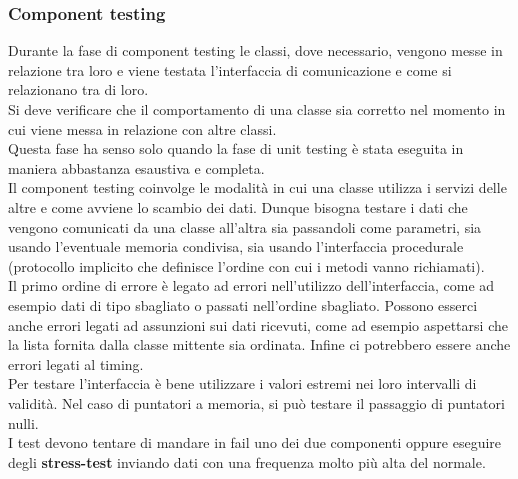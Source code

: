 \subsubsection{Component testing}
Durante la fase di component testing le classi, dove necessario, vengono messe in relazione tra loro e viene testata l'interfaccia di comunicazione e come si relazionano tra di loro.\\
Si deve verificare che il comportamento di una classe sia corretto nel momento in cui viene messa in relazione con altre classi.\\
Questa fase ha senso solo quando la fase di unit testing è stata eseguita in maniera abbastanza esaustiva e completa.\\
Il component testing coinvolge le modalità in cui una classe utilizza i servizi delle altre e come avviene lo scambio dei dati.
Dunque bisogna testare i dati che vengono comunicati da una classe all'altra sia passandoli come parametri, sia usando l'eventuale memoria condivisa, sia usando l'interfaccia procedurale (protocollo implicito che definisce l'ordine con cui i metodi vanno richiamati).\\
Il primo ordine di errore è legato ad errori nell'utilizzo dell'interfaccia, come ad esempio dati di tipo sbagliato o passati nell'ordine sbagliato.
Possono esserci anche errori legati ad assunzioni sui dati ricevuti, come ad esempio aspettarsi che la lista fornita dalla classe mittente sia ordinata.
Infine ci potrebbero essere anche errori legati al timing.\\
Per testare l'interfaccia è bene utilizzare i valori estremi nei loro intervalli di validità.
Nel caso di puntatori a memoria, si può testare il passaggio di puntatori nulli.\\
I test devono tentare di mandare in fail uno dei due componenti oppure eseguire degli \textbf{stress-test} inviando dati con una frequenza molto più alta del normale.

